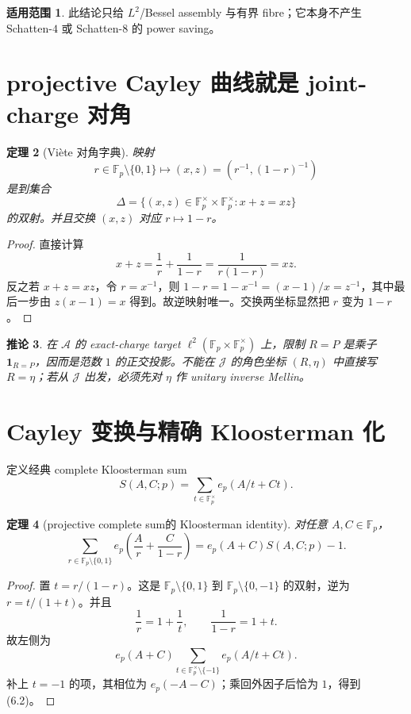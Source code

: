 \documentclass[11pt,a4paper]{ctexart}
\newtheorem{theorem}{定理}[section]
\newtheorem{corollary}[theorem]{推论}
\theoremstyle{definition}
\newtheorem{remark}[theorem]{适用范围}
\newcommand{\F}{\mathbb F}
\newcommand{\G}{\F_p^\times}
\newcommand{\ep}{e_p}
\newcommand{\1}{\mathbf 1}
\begin{document}
\begin{remark}
此结论只给 $L^2$/Bessel assembly 与有界 fibre；它本身不产生
Schatten-$4$ 或 Schatten-$8$ 的 power saving。
\end{remark}

\section{projective Cayley 曲线就是 joint-charge 对角}

\begin{theorem}[Vi\`ete 对角字典]
映射
\[
r\in\F_p\setminus\{0,1\}
\longmapsto
(x,z)=\left(r^{-1},(1-r)^{-1}\right)
\tag{5.1}
\]
是到集合
\[
\Delta=\{(x,z)\in\G\times\G:x+z=xz\}
\]
的双射。并且交换 $(x,z)$ 对应 $r\mapsto1-r$。
\end{theorem}

\begin{proof}
直接计算
\[
x+z=\frac{1}{r}+\frac1{1-r}
=\frac1{r(1-r)}=xz.
\]
反之若 $x+z=xz$，令 $r=x^{-1}$，则
$1-r=1-x^{-1}=(x-1)/x=z^{-1}$，其中最后一步由
$z(x-1)=x$ 得到。故逆映射唯一。交换两坐标显然把 $r$ 变为 $1-r$。
\end{proof}

\begin{corollary}
在 $\mathcal A$ 的 exact-charge target
$\ell^2(\F_p\times\G)$ 上，限制 $R=P$ 是乘子
$\1_{R=P}$，因而是范数 $1$ 的正交投影。不能在
$\mathcal J$ 的角色坐标 $(R,\eta)$ 中直接写 $R=\eta$；若从
$\mathcal J$ 出发，必须先对 $\eta$ 作 unitary inverse Mellin。
\end{corollary}

\section{Cayley 变换与精确 Kloosterman 化}

定义经典 complete Kloosterman sum
\[
S(A,C;p)=\sum_{t\in\G}\ep(A/t+Ct).
\tag{6.1}
\]

\begin{theorem}[projective complete sum的 Kloosterman identity]
对任意 $A,C\in\F_p$，
\[
\boxed{
\sum_{r\in\F_p\setminus\{0,1\}}
\ep\!\left(\frac A r+\frac C{1-r}\right)
=\ep(A+C)S(A,C;p)-1.}
\tag{6.2}
\]
\end{theorem}

\begin{proof}
置 $t=r/(1-r)$。这是
$\F_p\setminus\{0,1\}$ 到 $\F_p\setminus\{0,-1\}$ 的双射，逆为
$r=t/(1+t)$。并且
\[
\frac1r=1+\frac1t,\qquad \frac1{1-r}=1+t.
\]
故左侧为
\[
\ep(A+C)\sum_{t\in\G\setminus\{-1\}}\ep(A/t+Ct).
\]
补上 $t=-1$ 的项，其相位为 $\ep(-A-C)$；乘回外因子后恰为 $1$，得到 (6.2)。
\end{proof}
\end{document}
